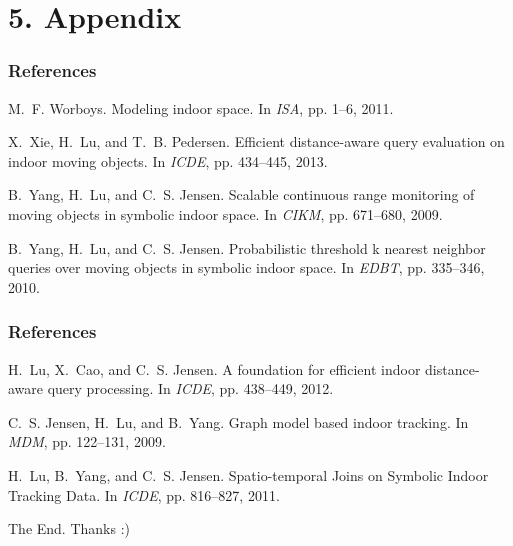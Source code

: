 \documentclass{beamer}
\begin{document}
\section{5. Appendix} %

\begin{frame}
\frametitle{References}
\footnotesize{
\begin{thebibliography}{99} %

M.~F. Worboys.
\newblock Modeling indoor space.
\newblock In {\em {ISA}}, pp. 1--6, 2011.

X.~Xie, H.~Lu, and T.~B. Pedersen.
\newblock Efficient distance-aware query evaluation on indoor moving objects.
\newblock In {\em ICDE}, pp. 434--445, 2013.

B.~Yang, H.~Lu, and C.~S. Jensen.
\newblock Scalable continuous range monitoring of moving objects in symbolic
  indoor space.
\newblock In {\em CIKM}, pp. 671--680, 2009.

B.~Yang, H.~Lu, and C.~S. Jensen.
\newblock Probabilistic threshold k nearest neighbor queries over moving
  objects in symbolic indoor space.
\newblock In {\em EDBT}, pp. 335--346, 2010.

\end{thebibliography}
}
\end{frame}


\begin{frame}
\frametitle{References}
\footnotesize{
\begin{thebibliography}{99} %

H.~Lu, X.~Cao, and C.~S. Jensen.
\newblock A foundation for efficient indoor distance-aware query processing.
\newblock In {\em ICDE}, pp. 438--449, 2012.

C.~S. Jensen, H.~Lu, and B.~Yang.
\newblock Graph model based indoor tracking.
\newblock In {\em {MDM}}, pp. 122--131, 2009.

H.~Lu, B.~Yang, and C.~S. Jensen.
\newblock Spatio-temporal Joins on Symbolic Indoor Tracking Data.
\newblock In {\em {ICDE}}, pp. 816--827, 2011.

\end{thebibliography}
}
\end{frame}


\begin{frame}
\Huge{\centerline{The End. Thanks :)}}
\end{frame}

\end{document}
